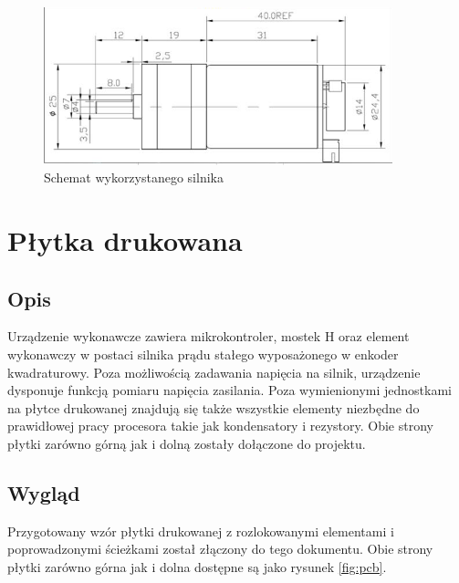             \begin{figure}[ht]
                \centering
                \includegraphics[width=0.9\textwidth]{img/silnik.png}
                \caption{Schemat wykorzystanego silnika}
                \label{fig:engine}
            \end{figure}


        \section{Płytka drukowana}
            \subsection{Opis}
                Urządzenie wykonawcze zawiera mikrokontroler, mostek H oraz element wykonawczy w postaci silnika prądu stałego wyposażonego w enkoder kwadraturowy. Poza możliwością zadawania napięcia na silnik, urządzenie dysponuje funkcją pomiaru napięcia zasilania. Poza wymienionymi jednostkami na płytce drukowanej znajdują się także wszystkie elementy niezbędne do prawidłowej pracy procesora takie jak kondensatory i rezystory. Obie strony płytki zarówno górną jak i dolną  zostały dołączone do projektu.
          
            \subsection{Wygląd}
                Przygotowany wzór płytki drukowanej z rozlokowanymi elementami i poprowadzonymi ścieżkami został złączony do tego dokumentu. Obie strony płytki zarówno górna jak i dolna dostępne są jako rysunek \ref{fig:pcb}.
                
